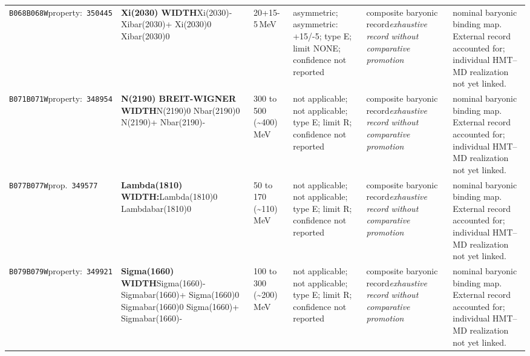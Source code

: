 \begin{landscape}
\begin{longtable}{L{1.85cm}L{4.45cm}L{2.35cm}L{4.05cm}L{3.35cm}L{7.15cm}}
\texttt{B068}\newline \texttt{B068W}\newline property:\ \texttt{350445} & \textbf{Xi(2030) WIDTH}\newline Xi(2030)- \textbar{}\allowbreak{} Xibar(2030)+ \textbar{}\allowbreak{} Xi(2030)0 \textbar{}\allowbreak{} Xibar(2030)0 & 20+15-5\,MeV & asymmetric; asymmetric: +15/-5; type E; limit NONE; confidence not reported & composite baryonic record\newline \emph{exhaustive record without comparative promotion} & nominal baryonic binding map. External record accounted for; individual HMT--MD realization not yet linked. \\
\texttt{B071}\newline \texttt{B071W}\newline property:\ \texttt{348954} & \textbf{N(2190) BREIT-WIGNER WIDTH}\newline N(2190)0 \textbar{}\allowbreak{} Nbar(2190)0 \textbar{}\allowbreak{} N(2190)+ \textbar{}\allowbreak{} Nbar(2190)- & 300 to 500 (\textasciitilde{}400)\,MeV & not applicable; not applicable; type E; limit R; confidence not reported & composite baryonic record\newline \emph{exhaustive record without comparative promotion} & nominal baryonic binding map. External record accounted for; individual HMT--MD realization not yet linked. \\
\texttt{B077}\newline \texttt{B077W}\newline prop.\ \texttt{349577} & \textbf{Lambda(1810) WIDTH:}\newline Lambda(1810)0 \textbar{}\allowbreak{} Lambdabar(1810)0 & 50 to 170 (\textasciitilde{}110)\,MeV & not applicable; not applicable; type E; limit R; confidence not reported & composite baryonic record\newline \emph{exhaustive record without comparative promotion} & nominal baryonic binding map. External record accounted for; individual HMT--MD realization not yet linked. \\
\texttt{B079}\newline \texttt{B079W}\newline property:\ \texttt{349921} & \textbf{Sigma(1660) WIDTH}\newline Sigma(1660)- \textbar{}\allowbreak{} Sigmabar(1660)+ \textbar{}\allowbreak{} Sigma(1660)0 \textbar{}\allowbreak{} Sigmabar(1660)0 \textbar{}\allowbreak{} Sigma(1660)+ \textbar{}\allowbreak{} Sigmabar(1660)- & 100 to 300 (\textasciitilde{}200)\,MeV & not applicable; not applicable; type E; limit R; confidence not reported & composite baryonic record\newline \emph{exhaustive record without comparative promotion} & nominal baryonic binding map. External record accounted for; individual HMT--MD realization not yet linked. \\

\end{longtable}
\end{landscape}
